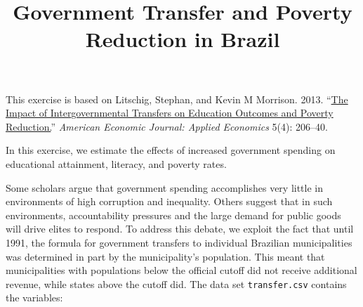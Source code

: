 \documentclass[]{article}
\title{Government Transfer and Poverty Reduction in Brazil}
\author{}
\date{}
\begin{document}
\maketitle


This exercise is based on Litschig, Stephan, and Kevin M Morrison. 2013.
``\href{http://dx.doi.org/10.1257/app.5.4.206}{The Impact of
Intergovernmental Transfers on Education Outcomes and Poverty
Reduction.}'' \emph{American Economic Journal: Applied Economics} 5(4):
206--40.

In this exercise, we estimate the effects of increased government
spending on educational attainment, literacy, and poverty rates.

Some scholars argue that government spending accomplishes very little in
environments of high corruption and inequality. Others suggest that in
such environments, accountability pressures and the large demand for
public goods will drive elites to respond. To address this debate, we
exploit the fact that until 1991, the formula for government transfers
to individual Brazilian municipalities was determined in part by the
municipality's population. This meant that municipalities with
populations below the official cutoff did not receive additional
revenue, while states above the cutoff did. The data set
\texttt{transfer.csv} contains the variables:
\end{document}
